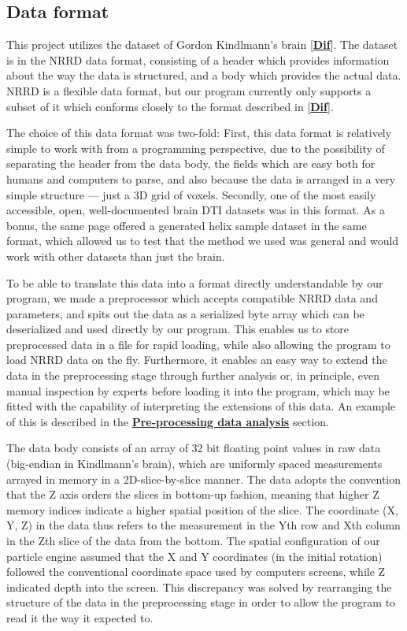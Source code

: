 \documentclass{article}
\newcommand{\reference}[1]{[\hyperref[ref:#1]{\textbf{#1}}]}
\newcommand{\secref}[2]{\hyperref[sec:#1]{\textbf{#2}}}
\begin{document}
\subsection*{Data format}


This project utilizes the dataset of Gordon Kindlmann's brain \reference{Dif}. The dataset is in the NRRD data format, consisting of a header which provides information about the way the data is structured, and a body which provides the actual data. NRRD is a flexible data format, but our program currently only supports a subset of it which conforms closely to the format described in \reference{Dif}.

The choice of this data format was two-fold: First, this data format is relatively simple to work with from a programming perspective, due to the possibility of separating the header from the data body, the fields which are easy both for humans and computers to parse, and also because the data is arranged in a very simple structure --- just a 3D grid of voxels. Secondly, one of the most easily accessible, open, well-documented brain DTI datasets was in this format. As a bonus, the same page offered a generated helix sample dataset in the same format, which allowed us to test that the method we used was general and would work with other datasets than just the brain.

To be able to translate this data into a format directly understandable by our program, we made a preprocessor which accepts compatible NRRD data and parameters, and spits out the data as a serialized byte array which can be deserialized and used directly by our program. This enables us to store preprocessed data in a file for rapid loading, while also allowing the program to load NRRD data on the fly. Furthermore, it enables an easy way to extend the data in the preprocessing stage through further analysis or, in principle, even manual inspection by experts before loading it into the program, which may be fitted with the capability of interpreting the extensions of this data. An example of this is described in the \secref{prepro}{Pre-processing data analysis} section.

The data body consists of an array of 32 bit floating point values in raw data (big-endian in Kindlmann's brain), which are uniformly spaced measurements arrayed in memory in a 2D-slice-by-slice manner. The data adopts the convention that the Z axis orders the slices in bottom-up fashion, meaning that higher Z memory indices indicate a higher spatial position of the slice. The coordinate (X, Y, Z) in the data thus refers to the measurement in the Yth row and Xth column in the Zth slice of the data from the bottom. The spatial configuration of our particle engine assumed that the X and Y coordinates (in the initial rotation) followed the conventional coordinate space used by computers screens, while Z indicated depth into the screen. This discrepancy was solved by rearranging the structure of the data in the preprocessing stage in order to allow the program to read it the way it expected to.
\end{document}
